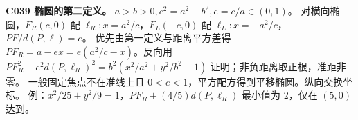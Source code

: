 \textbf{C039 椭圆的第二定义。} $a>b>0,c^2=a^2-b^2,e=c/a\in(0,1)$。
对横向椭圆，$F_R(c,0)$ 配 $\ell_R:x=a^2/c$，$F_L(-c,0)$ 配 $\ell_L:x=-a^2/c$，$PF/d(P,\ell)=e$。
优先由第一定义与距离平方差得 $PF_R=a-ex=e(a^2/c-x)$。反向用
$PF_R^2-e^2d(P,\ell_R)^2=b^2(x^2/a^2+y^2/b^2-1)$ 证明；非负距离取正根，准距非零。
一般固定焦点不在准线上且 $0<e<1$，平方配方得到平移椭圆。纵向交换坐标。
例：$x^2/25+y^2/9=1$，$PF_R+(4/5)d(P,\ell_R)$ 最小值为 $2$，仅在 $(5,0)$ 达到。
